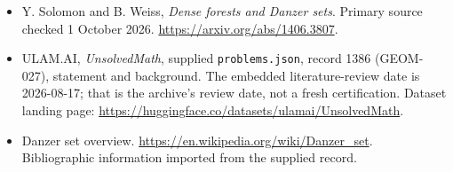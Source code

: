 \documentclass[11pt,a4paper]{article}
\begin{document}
{\small

\begin{itemize}
\item[E1] Y. Solomon and B. Weiss, \emph{Dense forests and Danzer sets}. Primary source checked 1 October 2026. \url{https://arxiv.org/abs/1406.3807}.


\item[\hypertarget{source:1386:1}{S1}] ULAM.AI, \emph{UnsolvedMath}, supplied \texttt{problems.json}, record 1386 (GEOM-027), statement and background. The embedded literature-review date is 2026-08-17; that is the archive’s review date, not a fresh certification. Dataset landing page: \url{https://huggingface.co/datasets/ulamai/UnsolvedMath}.

\item[\hypertarget{source:1386:2}{S2}] Danzer set overview. \url{https://en.wikipedia.org/wiki/Danzer_set}. Bibliographic information imported from the supplied record.

\end{itemize}

}

\label{end:1386}
\end{document}
